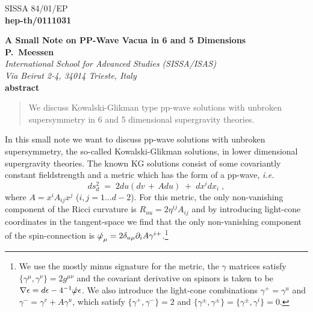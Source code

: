 \documentclass[a4paper,12pt]{article}
\begin{document}
\pagestyle{empty}
%
\begin{flushright}
\small
SISSA 84/01/EP\\
{\bf hep-th/0111031}\\
\normalsize
\end{flushright}
%
\begin{center}
{\large\bf A Small Note on PP-Wave Vacua in 6 and 5 Dimensions}\\[.5cm]
%
{\bf P.~Meessen}\\[.2cm]%
{\em International School for Advanced Studies (SISSA/ISAS)\\
Via Beirut 2-4, 34014 Trieste, Italy}\\[.5cm]
{\bf abstract}\\
\begin{quote}
{\small 
We discuss Kowalski-Glikman type pp-wave solutions with unbroken supersymmetry in
6 and 5 dimensional supergravity theories.
}
\end{quote}
\end{center}
\vspace{.5cm}
\pagestyle{plain}
In this small note we want to discuss pp-wave solutions
with unbroken supersymmetry, the so-called Kowalski-Glikman solutions,
in lower dimensional supergravity theories. 
The known KG solutions \cite{art:K_1,art:blau,art:K_3} consist of some covariantly constant
fieldstrength and a metric which has the form of a pp-wave, {\em i.e.}
\begin{equation}
\label{eq:wave_metric}
ds_{d}^{2} \;=\; 2du\left( dv\,+\, Adu\right)\;+\; dx^{i}dx_{i} \; ,
\end{equation}
where $A= x^{i}A_{ij}x^{j}$ ($i,j=1\ldots d-2$). For this metric, the only non-vanishing component
of the Ricci curvature is $R_{uu}= 2\eta^{ij}A_{ij}$ and by introducing light-cone coordinates
in the tangent-space we find that the only non-vanishing component of the spin-connection is
$\slashed{\omega}_{\mu}= 2\delta_{u\mu}\partial_{i}A\gamma^{i+}$.\footnote{We use the mostly minus
signature for the metric, the $\gamma$ matrices satisfy $\{ \gamma^{\mu},\gamma^{\nu}\} =2g^{\mu\nu}$
and the covariant derivative on spinors is taken to be 
$\nabla\epsilon =d\epsilon -4^{-1}\slashed{\omega}\epsilon$. We also introduce the light-cone combinations
$\gamma^{+}=\gamma^{u}$ and $\gamma^{-}=\gamma^{v}+A\gamma^{u}$, which satisfy 
$\{ \gamma^{+},\gamma^{-}\} = 2$ and $\{\gamma^{\pm},\gamma^{\pm}\} = \{\gamma^{\pm},\gamma^{i}\} =0$.}
\end{document}
